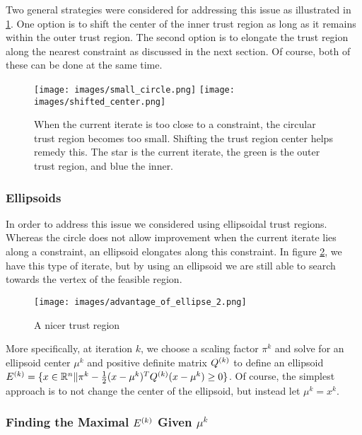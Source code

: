 Two general strategies were considered for addressing this issue as illustrated in \cref{options_basis}.
One option is to shift the center of the inner trust region as long as it remains within the outer trust region.
The second option is to elongate the trust region along the nearest constraint as discussed in the next section.
Of course, both of these can be done at the same time.


\begin{figure}[h]
    \centering
    \texttt{[image: images/small\_circle.png]}
    \texttt{[image: images/shifted\_center.png]}
    \caption{When the current iterate is too close to a constraint, the circular trust region becomes too small. Shifting the trust region center helps remedy this. The star is the current iterate, the green is the outer trust region, and blue the inner.}
    \label{options_basis}
\end{figure}

\subsubsection{Ellipsoids}

In order to address this issue we considered using ellipsoidal trust regions.
Whereas the circle does not allow improvement when the current iterate lies along a constraint, an ellipsoid elongates along this constraint.
In figure \cref{ellipse_adv}, we have this type of iterate, but by using an ellipsoid we are still able to search towards the vertex of the feasible region.
\begin{figure}[h]
    \centering
    \texttt{[image: images/advantage\_of\_ellipse\_2.png]}
    \caption{A nicer trust region}
    \label{ellipse_adv}
\end{figure}


More specifically, at iteration $k$, we choose a scaling factor $\pi^k$ and solve for an ellipsoid center $\mu^k$ and positive definite matrix ${Q^{(k)}}$ to define an ellipsoid
$ {E^{(k)}} = \{x \in \mathbb R^n \| \pi^k - \frac 1 2 (x - \mu^{k})^T{Q^{(k)}}(x - \mu^{k}) \ge 0 \}$.
Of course, the simplest approach is to not change the center of the ellipsoid, but instead let $\mu^k = x^k$.


\subsubsection{Finding the Maximal $ {E^{(k)}} $ Given $\mu^k$}

